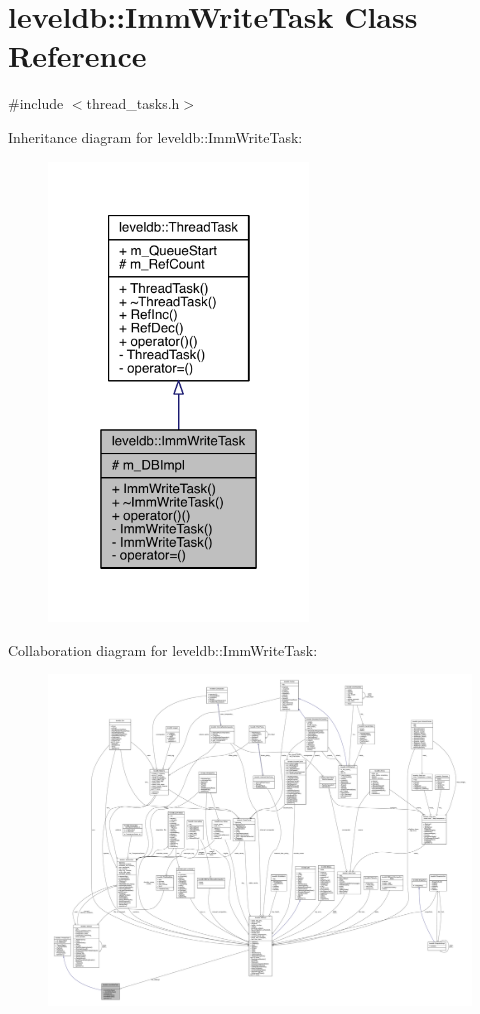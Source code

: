 \hypertarget{classleveldb_1_1_imm_write_task}{}\section{leveldb\+:\+:Imm\+Write\+Task Class Reference}
\label{classleveldb_1_1_imm_write_task}


{\ttfamily \#include $<$thread\+\_\+tasks.\+h$>$}



Inheritance diagram for leveldb\+:\+:Imm\+Write\+Task\+:\nopagebreak
\begin{figure}[H]
\begin{center}
\leavevmode
\includegraphics[width=196pt]{classleveldb_1_1_imm_write_task__inherit__graph}
\end{center}
\end{figure}


Collaboration diagram for leveldb\+:\+:Imm\+Write\+Task\+:
\nopagebreak
\begin{figure}[H]
\begin{center}
\leavevmode
\includegraphics[width=350pt]{classleveldb_1_1_imm_write_task__coll__graph}
\end{center}
\end{figure}
